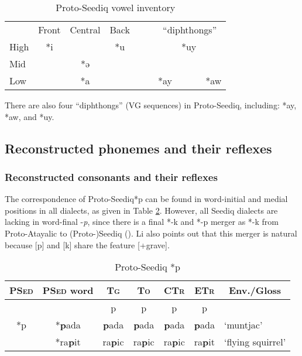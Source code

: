 \documentclass[12pt]{article}
\newcommand{\psed}{\textsc{PSed}\xspace}
\newcommand{\psedf}{Proto-Seediq\xspace}
\newcommand{\stg}{\textsc{Tg}\xspace}
\newcommand{\sto}{\textsc{To}\xspace}
\newcommand{\sctr}{\textsc{CTr}\xspace}
\newcommand{\setr}{\textsc{ETr}\xspace}
\begin{document}
\begin{table}[!htbp]
\centering
\caption{Proto-Seediq vowel inventory}
\label{tab:psedV}
\begin{tabular}{lcccccccc}
\cline{1-4} \cline{7-9}
     & Front & Central & Back &  &  & \multicolumn{3}{c}{``diphthongs''} \\ \cline{1-4} \cline{7-9}
High & *i    &         & *u   &  &  &            & *uy       &           \\
Mid  &       & *ə      &      &  &  &            &           &           \\
Low  &       & *a      &      &  &  & *ay        &           & *aw       \\ \cline{1-4} \cline{7-9}
\end{tabular}
\end{table}

There are also four ``diphthongs'' (VG sequences) in \psedf, including: *ay, *aw, and *uy. 

\subsection{Reconstructed phonemes and their reflexes}

\subsubsection{Reconstructed consonants and their reflexes}

The correspondence of \psedf *p can be found in word-initial and medial positions in all dialects, as given in Table \ref{tab:p}. However, all Seediq dialects are lacking in word-final -\textit{p}, since there is a final *-k and *-p merger as *-k from Proto-Atayalic to (Proto-)Seediq (\cite{li1981paic}). Li also points out that this merger is natural because [p] and [k] share the feature [+grave]. 

\begin{table}[!htbp]
\centering
\caption{Proto-Seediq *p}
\label{tab:p}
\begin{tabular}{c|c|cccc|l}
\textbf{\psed} & \textbf{\psed word}      & \textbf{\stg} & \textbf{\sto} & \textbf{\sctr} & \textbf{\setr} & \multicolumn{1}{c}{\textbf{Env./Gloss}} \\ \hline
\multirow{3}{*}{*p} & & p    & p    & p     & p     &                          \\             \cline{2-7}         
 & *\textbf{p}ada   & \textbf{p}ada & \textbf{p}ada & \textbf{p}ada & \textbf{p}ada & `muntjac' \\ 
 & *ra\textbf{p}it  & ra\textbf{p}ic & ra\textbf{p}ic & ra\textbf{p}ic & ra\textbf{p}it & `flying squirrel' \\ \hline
\end{tabular}
\end{table}
\end{document}
